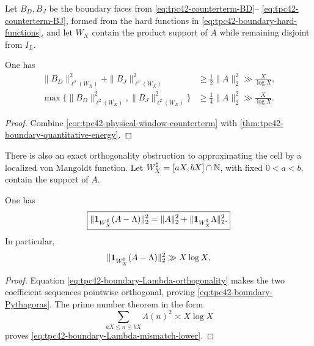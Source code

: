 Let \(B_D,B_J\) be the boundary faces from
\eqref{eq:tpc42-counterterm-BD}--
\eqref{eq:tpc42-counterterm-BJ}, formed from the hard functions in
\eqref{eq:tpc42-boundary-hard-functions}, and let \(W_X\) contain the
product support of \(A\) while remaining disjoint from \(I_L\).

\begin{corollary}
\label{cor:tpc42-boundary-face-lower}
One has
\begin{align}
 \|B_D\|_{\ell^2(W_X)}^2
 +\|B_J\|_{\ell^2(W_X)}^2
 &\ge\frac12\|A\|_2^2
 \gg\frac{X}{\log X},
 \label{eq:tpc42-boundary-sum-lower}\\
 \max\bigl\{
 \|B_D\|_{\ell^2(W_X)}^2,
 \|B_J\|_{\ell^2(W_X)}^2
 \bigr\}
 &\ge\frac14\|A\|_2^2
 \gg\frac{X}{\log X}.
 \label{eq:tpc42-boundary-max-lower}
\end{align}
\end{corollary}

\begin{proof}
Combine \cref{cor:tpc42-physical-window-counterterm} with
\cref{thm:tpc42-boundary-quantitative-energy}.
\end{proof}

There is also an exact orthogonality obstruction to approximating the
cell by a localized von Mangoldt function.  Let
\(W_X^\sharp=[aX,bX]\cap\mathbb N\), with fixed \(0<a<b\), contain the support
of \(A\).

\begin{corollary}
\label{cor:tpc42-boundary-Lambda-mismatch}
One has
\begin{equation}
 \boxed{
 \|\mathbf 1_{W_X^\sharp}(A-\Lambda)\|_2^2
 =\|A\|_2^2
  +\|\mathbf 1_{W_X^\sharp}\Lambda\|_2^2.}
 \label{eq:tpc42-boundary-Pythagoras}
\end{equation}
In particular,
\begin{equation}
 \|\mathbf 1_{W_X^\sharp}(A-\Lambda)\|_2^2
 \gg X\log X.
 \label{eq:tpc42-boundary-Lambda-mismatch-lower}
\end{equation}
\end{corollary}

\begin{proof}
Equation \eqref{eq:tpc42-boundary-Lambda-orthogonality} makes the two
coefficient sequences pointwise orthogonal, proving
\eqref{eq:tpc42-boundary-Pythagoras}.  The prime number theorem in the
form
\[
 \sum_{aX\le n\le bX}\Lambda(n)^2\asymp X\log X
\]
proves \eqref{eq:tpc42-boundary-Lambda-mismatch-lower}.
\end{proof}

